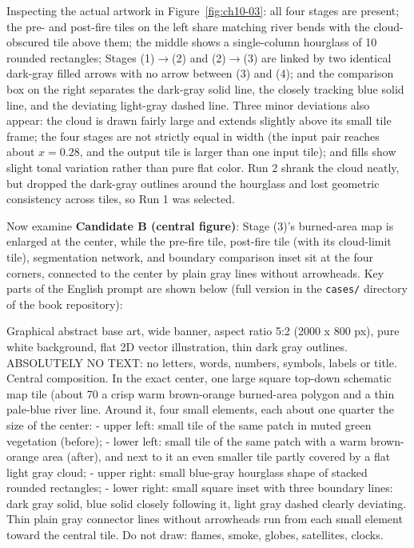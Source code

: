 Inspecting the actual artwork in Figure~\ref{fig:ch10-03}: all four stages are present; the pre- and post-fire tiles on the left share matching river bends with the cloud-obscured tile above them; the middle shows a single-column hourglass of 10 rounded rectangles; Stages (1)$\rightarrow$(2) and (2)$\rightarrow$(3) are linked by two identical dark-gray filled arrows with no arrow between (3) and (4); and the comparison box on the right separates the dark-gray solid line, the closely tracking blue solid line, and the deviating light-gray dashed line. Three minor deviations also appear: the cloud is drawn fairly large and extends slightly above its small tile frame; the four stages are not strictly equal in width (the input pair reaches about $x=0.28$, and the output tile is larger than one input tile); and fills show slight tonal variation rather than pure flat color. Run 2 shrank the cloud neatly, but dropped the dark-gray outlines around the hourglass and lost geometric consistency across tiles, so Run 1 was selected.

Now examine \textbf{Candidate B (central figure)}: Stage (3)'s burned-area map is enlarged at the center, while the pre-fire tile, post-fire tile (with its cloud-limit tile), segmentation network, and boundary comparison inset sit at the four corners, connected to the center by plain gray lines without arrowheads. Key parts of the English prompt are shown below (full version in the \texttt{cases/} directory of the book repository):

\begin{Prompt}
Graphical abstract base art, wide banner, aspect ratio 5:2 (2000 x 800 px),
pure white background, flat 2D vector illustration, thin dark gray outlines.
ABSOLUTELY NO TEXT: no letters, words, numbers, symbols, labels or title.
Central composition. In the exact center, one large square top-down schematic
map tile (about 70%
a crisp warm brown-orange burned-area polygon and a thin pale-blue river line.
Around it, four small elements, each about one quarter the size of the center:
- upper left: small tile of the same patch in muted green vegetation (before);
- lower left: small tile of the same patch with a warm brown-orange area (after),
  and next to it an even smaller tile partly covered by a flat light gray cloud;
- upper right: small blue-gray hourglass shape of stacked rounded rectangles;
- lower right: small square inset with three boundary lines: dark gray solid,
  blue solid closely following it, light gray dashed clearly deviating.
Thin plain gray connector lines without arrowheads run from each small element
toward the central tile. Do not draw: flames, smoke, globes, satellites, clocks.
\end{Prompt}

